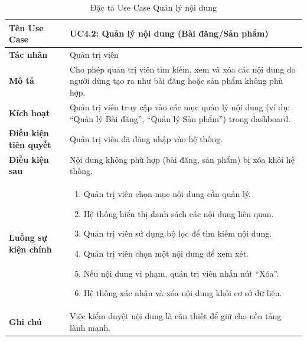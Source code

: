 \begin{table}[H]
\centering
\begin{tabularx}{\textwidth}{|l|X|}
\hline
\textbf{Tên Use Case} & \textbf{UC4.2: Quản lý nội dung (Bài đăng/Sản phẩm)} \\ \hline
\textbf{Tác nhân} & Quản trị viên \\ \hline
\textbf{Mô tả} & Cho phép quản trị viên tìm kiếm, xem và xóa các nội dung do người dùng tạo ra như bài đăng hoặc sản phẩm không phù hợp. \\ \hline
\textbf{Kích hoạt} & Quản trị viên truy cập vào các mục quản lý nội dung (ví dụ: ``Quản lý Bài đăng'', ``Quản lý Sản phẩm'') trong dashboard. \\ \hline
\textbf{Điều kiện tiên quyết} & Quản trị viên đã đăng nhập vào hệ thống. \\ \hline
\textbf{Điều kiện sau} & Nội dung không phù hợp (bài đăng, sản phẩm) bị xóa khỏi hệ thống. \\ \hline
\textbf{Luồng sự kiện chính} & 
\begin{enumerate}
    \item Quản trị viên chọn mục nội dung cần quản lý.
    \item Hệ thống hiển thị danh sách các nội dung liên quan.
    \item Quản trị viên sử dụng bộ lọc để tìm kiếm nội dung.
    \item Quản trị viên chọn một nội dung để xem xét.
    \item Nếu nội dung vi phạm, quản trị viên nhấn nút ``Xóa''.
    \item Hệ thống xác nhận và xóa nội dung khỏi cơ sở dữ liệu.
\end{enumerate} \\ \hline
\textbf{Ghi chú} & Việc kiểm duyệt nội dung là cần thiết để giữ cho nền tảng lành mạnh. \\ \hline
\end{tabularx}
\caption{Đặc tả Use Case Quản lý nội dung}
\end{table}

